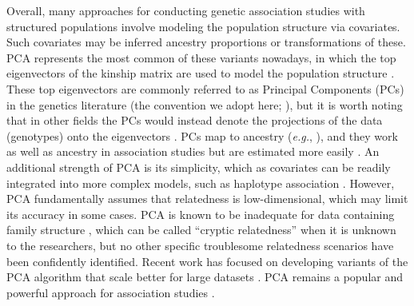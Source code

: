 \documentclass[11pt]{article}
\begin{document}
Overall, many approaches for conducting genetic association studies with structured populations involve modeling the population structure via covariates.
Such covariates may be inferred ancestry proportions \citep{pritchard_association_2000} or transformations of these.
PCA represents the most common of these variants nowadays, in which the top eigenvectors of the kinship matrix are used to model the population structure \citep{zhang_semiparametric_2003, price_principal_2006, bouaziz_accounting_2011}.
These top eigenvectors are commonly referred to as Principal Components (PCs) in the genetics literature (the convention we adopt here; \cite{patterson_population_2006}), but it is worth noting that in other fields the PCs would instead denote the projections of the data (genotypes) onto the eigenvectors \citep{jolliffe_principal_2002}.
PCs map to ancestry (\textit{e.g.}, \cite{zhou_strong_2016}), and they work as well as ancestry in association studies but are estimated more easily \citep{patterson_population_2006, zhao_arabidopsis_2007, bouaziz_accounting_2011}.
An additional strength of PCA is its simplicity, which as covariates can be readily integrated into more complex models, such as haplotype association \citep{xu_detecting_2014}.
However, PCA fundamentally assumes that relatedness is low-dimensional, which may limit its accuracy in some cases.
PCA is known to be inadequate for data containing family structure \citep{patterson_population_2006, thornton_roadtrips:_2010, price_new_2010}, which can be called ``cryptic relatedness'' when it is unknown to the researchers, but no other specific troublesome relatedness scenarios have been confidently identified.
Recent work has focused on developing variants of the PCA algorithm that scale better for large datasets \citep{lee_sparse_2012, abraham_fast_2014, galinsky_fast_2016, abraham_flashpca2:_2017, agrawal_scalable_2020}.
PCA remains a popular and powerful approach for association studies \citep{wojcik_genetic_2019}.
\end{document}
